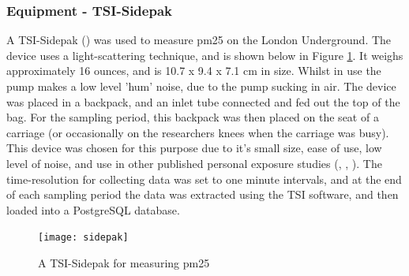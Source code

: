 \subsubsection{Equipment - TSI-Sidepak}
\label{sec:equipment_tsi_sidepak}

A TSI-Sidepak (\cite{TSI2015}) was used to measure \gls{pm25} on the London Underground. The device uses a light-scattering technique, and is shown below in Figure \ref{fig:sidepak}. It weighs approximately 16 ounces, and is 10.7 x 9.4 x 7.1 cm in size. Whilst in use the pump makes a low level 'hum' noise, due to the pump sucking in air. The device was placed in a backpack, and an inlet tube connected and fed out the top of the bag. For the sampling period, this backpack was then placed on the seat of a carriage (or occasionally on the researchers knees when the carriage was busy). This device was chosen for this purpose due to it's small size, ease of use, low level of noise, and use in other published personal exposure studies (\cite{Huang2015}, \cite{Han2015}, \cite{Yu2016}). The time-resolution for collecting data was set to one minute intervals, and at the end of each sampling period the data was extracted using the TSI software, and then loaded into a PostgreSQL database.

\begin{figure}[H]
\centering
\texttt{[image: sidepak]}
\caption{A TSI-Sidepak for measuring \gls{pm25}}
\label{fig:sidepak}
\end{figure}

